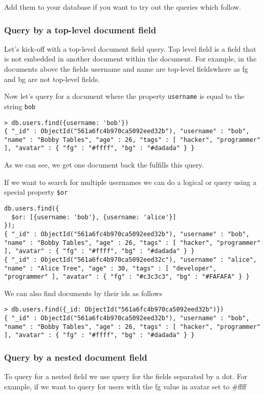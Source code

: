 Add them to your database if you want to try out the queries which follow.

\subsubsection{Query by a top-level document field}
Let's kick-off with a top-level document field query. Top level field is a field that is not embedded in another document within the document. For example, in the documents above the fields username and name are top-level fieldswhere as fg and bg are not top-level fields.

Now let's query for a document where the property \texttt{username} is equal to the string \texttt{bob}

\begin{lstlisting}
> db.users.find({username: 'bob'})
{ "_id" : ObjectId("561a6fc4b970ca5092eed32b"), "username" : "bob", "name" : "Bobby Tables", "age" : 26, "tags" : [ "hacker", "programmer" ], "avatar" : { "fg" : "#ffff", "bg" : "#dadada" } }
\end{lstlisting}

As we can see, we get one document back the fulfills this query.

If we want to search for multiple usernames we can do a logical or query using a special property \texttt{\$or}

\begin{lstlisting}
db.users.find({
  $or: [{username: 'bob'}, {username: 'alice'}]
});
{ "_id" : ObjectId("561a6fc4b970ca5092eed32b"), "username" : "bob", "name" : "Bobby Tables", "age" : 26, "tags" : [ "hacker", "programmer" ], "avatar" : { "fg" : "#ffff", "bg" : "#dadada" } }
{ "_id" : ObjectId("561a6fc4b970ca5092eed32c"), "username" : "alice", "name" : "Alice Tree", "age" : 30, "tags" : [ "developer", "programmer" ], "avatar" : { "fg" : "#c3c3c3", "bg" : "#FAFAFA" } }
\end{lstlisting}

We can also find documents by their ids as follows

\begin{lstlisting}
> db.users.find({_id: ObjectId("561a6fc4b970ca5092eed32b")})
{ "_id" : ObjectId("561a6fc4b970ca5092eed32b"), "username" : "bob", "name" : "Bobby Tables", "age" : 26, "tags" : [ "hacker", "programmer" ], "avatar" : { "fg" : "#ffff", "bg" : "#dadada" } }
\end{lstlisting}

\subsubsection{Query by a nested document field}
To query for a nested field we use query for the fields separated by a dot. For example, if we want to query for users with the fg value in avatar set to \#ffff

